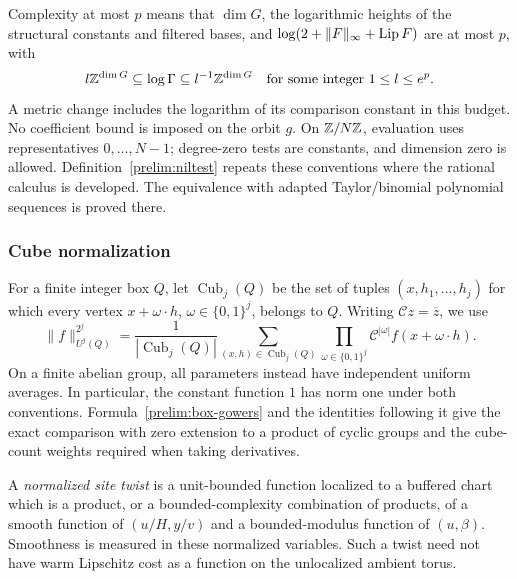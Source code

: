 Complexity at most $p$ means that $\dim G$, the logarithmic heights
of the structural constants and filtered bases, and
$\log(2+\|F\|_\infty+\operatorname{Lip} F)$ are at most $p$, with
\[
 l\mathbb Z^{\dim G}\subseteq\log\Gamma\subseteq l^{-1}\mathbb Z^{\dim G}
 \quad\text{for some integer }1\le l\le e^p.
\]
A metric change includes the logarithm of its comparison constant in
this budget. No coefficient bound is imposed on the orbit $g$.
On $\mathbb Z/N\mathbb Z$, evaluation uses representatives $0,\ldots,N-1$;
degree-zero tests are constants, and dimension zero is allowed.
Definition~\ref{prelim:niltest} repeats these conventions where the
rational calculus is developed. The equivalence with adapted
Taylor/binomial polynomial sequences is proved there.


\subsubsection{Cube normalization}\label{ap:cube-conventions}
For a finite integer box $Q$, let $\operatorname{Cub}_j(Q)$ be the
set of tuples $(x,h_1,\ldots,h_j)$ for which every vertex
$x+\omega\cdot h$, $\omega\in\{0,1\}^j$, belongs to $Q$.
Writing $\mathcal C z=\overline z$, we use
\[
 \|f\|_{U^j(Q)}^{2^j}
 =\frac{1}{|\operatorname{Cub}_j(Q)|}
   \sum_{(x,h)\in\operatorname{Cub}_j(Q)}
   \prod_{\omega\in\{0,1\}^j}
       \mathcal C^{|\omega|}f(x+\omega\cdot h).
\]
On a finite abelian group, all parameters instead have independent
uniform averages. In particular, the constant function $1$ has norm
one under both conventions. Formula~\eqref{prelim:box-gowers}
and the identities following it give the exact comparison with
zero extension to a product of cyclic groups and the cube-count
weights required when taking derivatives.




A \emph{normalized site twist} is a unit-bounded function localized
to a buffered chart which is a product, or a bounded-complexity
combination of products, of a smooth function of $(u/H,y/v)$ and a
bounded-modulus function of $(u,\beta)$.  Smoothness is measured in
these normalized variables.  Such a twist need not have warm
Lipschitz cost as a function on the unlocalized ambient torus.

